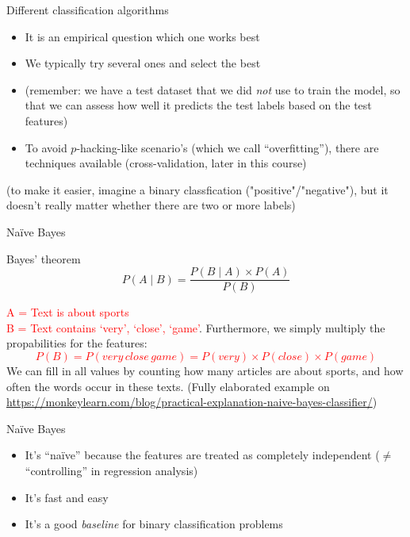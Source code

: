 \begin{frame}{Different classification algorithms}

\begin{itemize}[<+->]
	\item It is an empirical question which one works best
	\item We typically try several ones and select the best
	\item (remember: we have a test dataset that we did \emph{not} use to train the model, so that we can assess how well it predicts the test labels based on the test features)
	\item To avoid $p$-hacking-like scenario's (which we call ``overfitting''), there are techniques available (cross-validation, later in this course)
\end{itemize}
(to make it easier, imagine a binary classfication ("positive"/"negative"), but it doesn't really matter whether there are two or more labels)
\end{frame}






\begin{frame}{Naïve Bayes}
	\begin{block}{Bayes' theorem}
		$$ P(A \mid B) = \frac{P(B \mid A) \times P(A)}{P(B)} $$
	\end{block}
	\pause
	\textcolor{red}{A = Text is about sports\\
		B = Text contains `very', `close', `game'}.
	\pause
	Furthermore, we simply multiply the propabilities for the features:
	\textcolor{red}{$$P(B) = P(very\, close\, game) = P(very) \times P(close) \times P(game)$$}
	We can fill in all values by counting how many articles are about sports, and how often the words occur in these texts.
	\vspace{0.3cm}
	\tiny{
		(Fully elaborated example on \url{https://monkeylearn.com/blog/practical-explanation-naive-bayes-classifier/})}\\
\end{frame}

\begin{frame}{Naïve Bayes}
	\begin{itemize}[<+->]
		\item It's ``naïve'' because the features are treated as completely independent ($\neq$ ``controlling'' in regression analysis)
		\item It's fast and easy
		\item It's a good \emph{baseline} for binary classification problems
	\end{itemize}
\end{frame}




